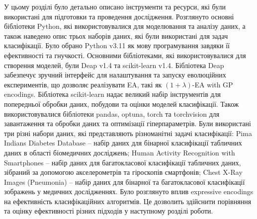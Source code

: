 У цьому розділі було детально описано інструменти та ресурси, які були використані для підготовки та проведення дослідження. Розглянуто основні бібліотеки Python, які використовувалися для моделювання та аналізу даних, а також наведено опис трьох наборів даних, які були використані для задач класифікації. Було обрано Python v3.11 як мову програмування завдяки її ефективності та гнучкості. Основними бібліотеками, які використовувалися для створення моделей, були Deap v1.4 та scikit-learn v1.4. Бібліотека Deap забезпечує зручний інтерфейс для налаштування та запуску еволюційних експериментів, що дозволяє реалізувати EA, такі як $(1+\lambda)$-EA with GP encodings. Бібліотека scikit-learn надає великий набір інструментів для попередньої обробки даних, побудови та оцінки моделей класифікації. Також використовувалися бібліотеки pandas, optuna, torch та torchvision для завантаження та обробки даних та оптимізації гіперпараметрів. Були використані три різні набори даних, які представляють різноманітні задачі класифікації: Pima Indians Diabetes Database -- набір даних для бінарної класифікації табличних даних в області біомедичних досліджень; Human Activity Recognition with Smartphones -- набір даних для багатокласової класифікації табличних даних, зібраний за допомогою акселерометрів та гіроскопів смартфонів; Chest X-Ray Images (Pneumonia) -- набір даних для бінарної та багатокласової класифікації зображень у медичних дослідженнях. Було розглянуто вплив expressive encodings на ефективність класифікаційних алгоритмів. Це дозволить здійснити порівняння та оцінку ефективності різних підходів у наступному розділі роботи.